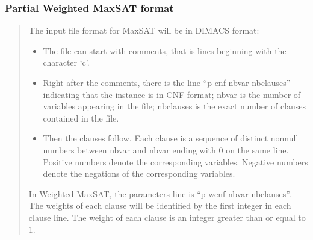 \documentclass[letterpaper,10pt,openany,oneside,english]{sphinxmanual}
\begin{document}
\subsubsection{Partial Weighted MaxSAT format}
\label{\detokenize{formats/cnfwcnfformat:partial-weighted-maxsat-format}}\label{\detokenize{formats/cnfwcnfformat:cnfwcnf-format}}\label{\detokenize{formats/cnfwcnfformat::doc}}\begin{quote}

\sphinxAtStartPar
{}

\sphinxAtStartPar
The input file format for Max\sphinxhyphen{}SAT will be in DIMACS format:

\begin{sphinxVerbatim}[commandchars=\\\{\}]
  
   
  
   
  
  
\end{sphinxVerbatim}
\begin{itemize}
\item {} 
\sphinxAtStartPar
The file can start with comments, that is lines beginning with the character ‘c’.

\item {} 
\sphinxAtStartPar
Right after the comments, there is the line “p cnf nbvar nbclauses” indicating that the instance is in CNF format; nbvar is the number of variables appearing in the file; nbclauses is the exact number of clauses contained in the file.

\item {} 
\sphinxAtStartPar
Then the clauses follow. Each clause is a sequence of distinct non\sphinxhyphen{}null numbers between \sphinxhyphen{}nbvar and nbvar ending with 0 on the same line. Positive numbers denote the corresponding variables. Negative numbers denote the negations of the corresponding variables.

\end{itemize}

\sphinxAtStartPar
{}

\sphinxAtStartPar
In Weighted Max\sphinxhyphen{}SAT, the parameters line is “p wcnf nbvar nbclauses”. The weights of each clause will be identified by the first integer in each clause line. The weight of each clause is an integer greater than or equal to 1.


\end{quote}
\end{document}
